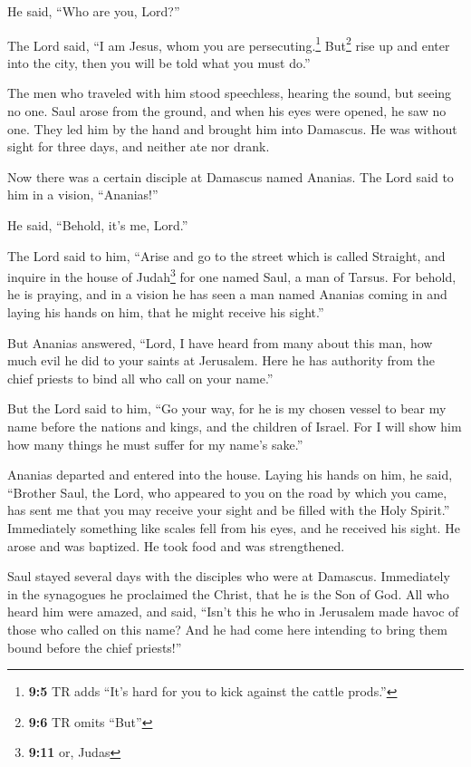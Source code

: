 He said, ``Who are you, Lord?''

The Lord said, ``I am Jesus, whom you are persecuting.\footnote{\textbf{9:5}
  TR adds ``It's hard for you to kick against the cattle prods.''}
 But\footnote{\textbf{9:6} TR omits ``But''} rise up and
enter into the city, then you will be told what you must do.''

 The men who traveled with him stood speechless, hearing
the sound, but seeing no one.  Saul arose from the ground,
and when his eyes were opened, he saw no one. They led him by the hand
and brought him into Damascus.  He was without sight for
three days, and neither ate nor drank.

 Now there was a certain disciple at Damascus named
Ananias. The Lord said to him in a vision, ``Ananias!''

He said, ``Behold, it's me, Lord.''

 The Lord said to him, ``Arise and go to the street which
is called Straight, and inquire in the house of Judah\footnote{\textbf{9:11}
  or, Judas} for one named Saul, a man of Tarsus. For behold, he is
praying,  and in a vision he has seen a man named Ananias
coming in and laying his hands on him, that he might receive his
sight.''

 But Ananias answered, ``Lord, I have heard from many
about this man, how much evil he did to your saints at Jerusalem.
 Here he has authority from the chief priests to bind all
who call on your name.''

 But the Lord said to him, ``Go your way, for he is my
chosen vessel to bear my name before the nations and kings, and the
children of Israel.  For I will show him how many things
he must suffer for my name's sake.''

 Ananias departed and entered into the house. Laying his
hands on him, he said, ``Brother Saul, the Lord, who appeared to you on
the road by which you came, has sent me that you may receive your sight
and be filled with the Holy Spirit.''  Immediately
something like scales fell from his eyes, and he received his sight. He
arose and was baptized.  He took food and was
strengthened.

Saul stayed several days with the disciples who were at Damascus.
 Immediately in the synagogues he proclaimed the Christ,
that he is the Son of God.  All who heard him were
amazed, and said, ``Isn't this he who in Jerusalem made havoc of those
who called on this name? And he had come here intending to bring them
bound before the chief priests!''

